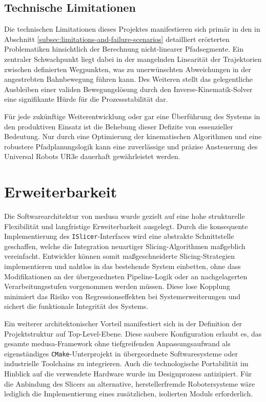     \subsection{Technische Limitationen}\label{subsec:technical-limitations}
      Die technischen Limitationen dieses Projektes manifestieren sich primär in den in Abschnitt \ref{subsec:limitations-and-failure-scenarios} detailliert erörterten Problematiken hinsichtlich der Berechnung nicht-linearer Pfadsegmente.
      Ein zentraler Schwachpunkt liegt dabei in der mangelnden Linearität der Trajektorien zwischen definierten Wegpunkten, was zu unerwünschten Abweichungen in der angestrebten Bahnbewegung führen kann.
      Des Weiteren stellt das gelegentliche Ausbleiben einer validen Bewegungslösung durch den Inverse-Kinematik-Solver eine signifikante Hürde für die Prozessstabilität dar.

      Für jede zukünftige Weiterentwicklung oder gar eine Überführung des Systems in den produktiven Einsatz ist die Behebung dieser Defizite von essenzieller Bedeutung.
      Nur durch eine Optimierung der kinematischen Algorithmen und eine robustere Pfadplanungslogik kann eine zuverlässige und präzise Ansteuerung des Universal Robots UR3e dauerhaft gewährleistet werden.

  \section{Erweiterbarkeit} \label{sec:discussion-extensibility}
    Die Softwarearchitektur von \ac{medusa} wurde gezielt auf eine hohe strukturelle Flexibilität und langfristige Erweiterbarkeit ausgelegt.
    Durch die konsequente Implementierung des \texttt{ISlicer}-Interfaces wird eine abstrakte Schnittstelle geschaffen, welche die Integration neuartiger Slicing-Algorithmen maßgeblich vereinfacht.
    Entwickler können somit maßgeschneiderte Slicing-Strategien implementieren und nahtlos in das bestehende System einbetten, ohne dass Modifikationen an der übergeordneten Pipeline-Logik oder an nachgelagerten Verarbeitungsstufen vorgenommen werden müssen.
    Diese lose Kopplung minimiert das Risiko von Regressionseffekten bei Systemerweiterungen und sichert die funktionale Integrität des Systems.

    Ein weiterer architektonischer Vorteil manifestiert sich in der Definition der Projektstruktur auf Top-Level-Ebene.
    Diese saubere Konfiguration erlaubt es, das gesamte \ac{medusa}-Framework ohne tiefgreifenden Anpassungsaufwand als eigenständiges \texttt{CMake}-Unterprojekt in übergeordnete Softwaresysteme oder industrielle Toolchains zu integrieren.
    Auch die technologische Portabilität im Hinblick auf die verwendete Hardware wurde im Designprozess antizipiert.
    Für die Anbindung des Slicers an alternative, herstellerfremde Robotersysteme wäre lediglich die Implementierung eines zusätzlichen, isolierten Moduls erforderlich.

